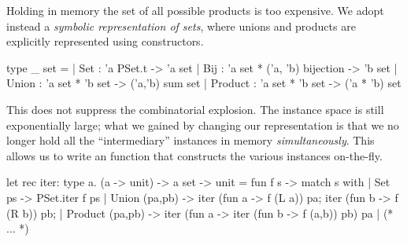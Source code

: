 Holding in memory the set of all possible products is too expensive. We adopt
instead a \emph{symbolic representation of sets}, where unions and products are
explicitly represented using constructors.
%
\begin{ocamlcode}
type _ set =
  | Set   : 'a PSet.t -> 'a set
  | Bij   : 'a set * ('a, 'b) bijection -> 'b set
  | Union   : 'a set * 'b set -> ('a,'b) sum set
  | Product : 'a set * 'b set -> ('a * 'b) set
\end{ocamlcode}
%
This does not suppress the combinatorial explosion. The instance space is still
exponentially large; what we gained by changing our representation is that we
no longer hold all the ``intermediary'' instances in memory
\emph{simultaneously}. This allows us to write an  function that
constructs the various instances on-the-fly.
%
\begin{ocamlcode}
  let rec iter: type a. (a -> unit) -> a set -> unit =
  fun f s -> match s with
    | Set ps ->
        PSet.iter f ps
    | Union (pa,pb) ->
        iter (fun a -> f (L a)) pa;
        iter (fun b -> f (R b)) pb;
    | Product (pa,pb) ->
        iter (fun a -> iter (fun b -> f (a,b)) pb) pa
    | (* ... *)
\end{ocamlcode}
%

